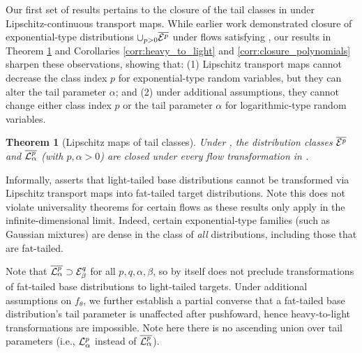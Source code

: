 \documentclass[nohyperref]{article}
\theoremstyle{plain}
\newtheorem{theorem}{Theorem}[section]
\theoremstyle{definition}
\theoremstyle{remark}
\begin{document}
\vspace{-1mm}
Our first set of results pertains to the closure of the tail classes in 
under Lipschitz-continuous transport maps. While earlier work \citep{jaini2020tails} demonstrated
closure of exponential-type distributions $\cup_{p > 0} \overline{\mathcal{E}^p}$ under flows satisfying , our results in Theorem \ref{thm:distn_class_closed} and Corollaries \ref{corr:heavy_to_light} and \ref{corr:closure_polynomials} sharpen these observations, showing that: (1) Lipschitz transport maps cannot decrease the class index $p$ for exponential-type random variables, but they can alter the tail parameter $\alpha$; and
(2) under additional assumptions, they cannot change either class index $p$ or the tail parameter $\alpha$ for logarithmic-type random variables.

\begin{theorem}[Lipschitz maps of tail classes]
  \label{thm:distn_class_closed}
  Under ,
  the distribution classes $\overline{\mathcal{E}^p}$
  and $\overline{\mathcal{L}^p_\alpha}$ (with $p,\alpha > 0$) are closed
  under every flow transformation in .
\end{theorem}

Informally,  asserts that light-tailed base distributions cannot be transformed
via Lipschitz transport maps into fat-tailed target distributions.
Note this does not violate universality theorems for certain flows \citep{huang2018neural}
as these results only apply in the infinite-dimensional limit. Indeed, certain exponential-type families (such as Gaussian mixtures) are dense in the class of \emph{all} distributions, including those that are fat-tailed.

Note that $\overline{\mathcal{L}^p_\alpha} \supset \mathcal{E}^q_\beta$ for all $p,q,\alpha,\beta$, so 
by itself does not preclude transformations of fat-tailed base distributions to light-tailed targets.
Under additional assumptions on $f_\theta$, we further establish a partial converse that a fat-tailed base distribution's tail parameter is unaffected after pushfoward,
hence heavy-to-light transformations are impossible. Note here there is no ascending union over
tail parameters (i.e., $\mathcal{L}^p_\alpha$ instead of $\overline{\mathcal{L}^p_\alpha}$).
\end{document}

